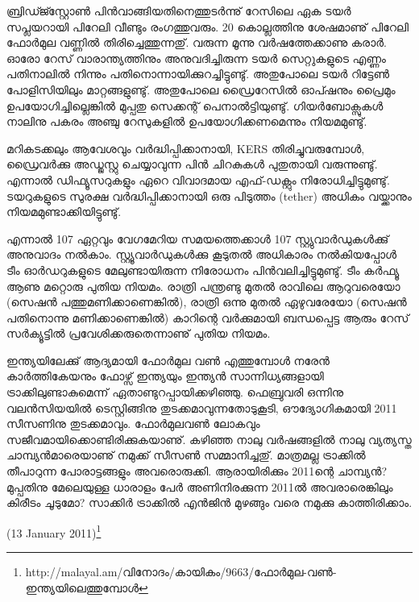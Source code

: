 ബ്രിഡ്ജ്സ്റ്റോണ്‍ പിന്‍വാങ്ങിയതിനെത്തുടര്‍ന്നു് റേസിലെ ഏക ടയര്‍ സപ്ലയറായി പിറേലി വീണ്ടും രംഗത്തുവരും. 20 
കൊല്ലത്തിനു ശേഷമാണു് പിറേലി ഫോര്‍മുല വണ്ണില്‍ തിരിച്ചെത്തുന്നതു്. വരുന്ന മൂന്നു വര്‍ഷത്തേക്കാണു കരാര്‍. ഓരോ
റേസ് വാരാന്ത്യത്തിനും അനുവദിച്ചിരുന്ന ടയര്‍ സെറ്റുകളുടെ എണ്ണം പതിനാലില്‍ നിന്നും പതിനൊന്നായിക്കുറച്ചിട്ടുണ്ടു്. 
അതുപോലെ ടയര്‍ റിട്ടേണ്‍ പോളിസിയിലും മാറ്റങ്ങളുണ്ടു്. അതുപോലെ ഡ്രൈറേസില്‍ ഓപ്ഷനും പ്രൈമും 
ഉപയോഗിച്ചില്ലെങ്കില്‍ മുപ്പതു സെക്കന്റ് പെനാല്‍ട്ടിയുണ്ടു്. ഗിയര്‍ബോക്സുകള്‍ നാലിനു പകരം അഞ്ചു റേസുകളില്‍ 
ഉപയോഗിക്കണമെന്നും നിയമമുണ്ടു്.

മറികടക്കലും ആവേശവും വര്‍ദ്ധിപ്പിക്കാനായി, KERS തിരിച്ചുവരുമ്പോള്‍, ഡ്രൈവര്‍ക്കു അഡ്ജസ്റ്റു ചെയ്യാവുന്ന പിന്‍ 
ചിറകുകള്‍ പുതുതായി വരുന്നുണ്ടു്. എന്നാല്‍ ഡിഫ്യൂസറുകളും ഏറെ വിവാദമായ എഫ്-ഡക്റ്റും നിരോധിച്ചിട്ടുമുണ്ടു്. 
ടയറുകളുടെ സുരക്ഷ വര്‍ദ്ധിപ്പിക്കാനായി ഒരു പിടുത്തം (tether) അധികം വയ്ക്കാനും നിയമമുണ്ടാക്കിയിട്ടുണ്ടു്.

എന്നാല്‍ 107%
ഏറ്റവും വേഗമേറിയ സമയത്തെക്കാള്‍ 107%
സ്റ്റ്യുവാര്‍ഡുകള്‍ക്കു് അനുവാദം നല്‍കാം. സ്റ്റ്യൂവാര്‍ഡുകള്‍ക്കു കൂടുതല്‍ അധികാരം നല്‍കിയപ്പോള്‍ ടീം ഓര്‍ഡറുകളുടെ 
മേലുണ്ടായിരുന്ന നിരോധനം പിന്‍വലിച്ചിട്ടുമുണ്ടു്. ടീം കര്‍ഫ്യൂ ആണു മറ്റൊരു പുതിയ നിയമം. രാത്രി പന്ത്രണ്ടു മുതല്‍ 
രാവിലെ ആറുവരെയോ (സെഷന്‍ പത്തുമണിക്കാണെങ്കില്‍), രാത്രി ഒന്നു മുതല്‍ ഏഴുവരേയോ (സെഷന്‍ പതിനൊന്നു 
മണിക്കാണെങ്കില്‍) കാറിന്റെ വര്‍ക്കുമായി ബന്ധപ്പെട്ട ആരും റേസ് സര്‍ക്യൂട്ടില്‍ പ്രവേശിക്കരുതെന്നാണു് പുതിയ നിയമം.

ഇന്ത്യയിലേക്കു് ആദ്യമായി ഫോര്‍മുല വണ്‍ എത്തുമ്പോള്‍ നരേന്‍ കാര്‍ത്തികേയനും ഫോഴ്സ് ഇന്ത്യയും ഇന്ത്യന്‍ 
സാന്നിധ്യങ്ങളായി ട്രാക്കിലുണ്ടാകുമെന്ന് ഏതാണ്ടുറപ്പായിക്കഴിഞ്ഞു. ഫെബ്രുവരി ഒന്നിനു വലന്‍സിയയില്‍ ടെസ്റ്റിങ്ങിനു 
തുടക്കമാവുന്നതോടുകൂടി, ഔദ്യോഗികമായി 2011 സീസണിനു തുടക്കമാവും. ഫോര്‍മുലവണ്‍ ലോകവും 
സജീവമായിക്കൊണ്ടിരിക്കുകയാണു്. കഴിഞ്ഞ നാലു വര്‍ഷങ്ങളില്‍ നാലു വ്യത്യസ്ത ചാമ്പ്യന്‍മാരെയാണു് നമുക്ക് 
സീസണ്‍ സമ്മാനിച്ചതു്. മാത്രമല്ല ട്രാക്കില്‍ തീപാറുന്ന പോരാട്ടങ്ങളും അവരൊരുക്കി. ആരായിരിക്കും 2011ന്റെ ചാമ്പ്യന്‍? 
മുപ്പതിനു മേലെയുള്ള ധാരാളം പേര്‍ അണിനിരക്കുന്ന 2011ല്‍ അവരാരെങ്കിലും കിരീടം ചൂടുമോ? സാക്കിര്‍ ട്രാക്കില്‍ 
എന്‍ജിന്‍ മുഴങ്ങും വരെ നമുക്കു കാത്തിരിക്കാം.

(13 January 2011)\footnote{http://malayal.am/വിനോദം/കായികം/9663/ഫോര്‍മുല-വണ്‍-ഇന്ത്യയിലെത്തുമ്പോള്‍}

\newpage
